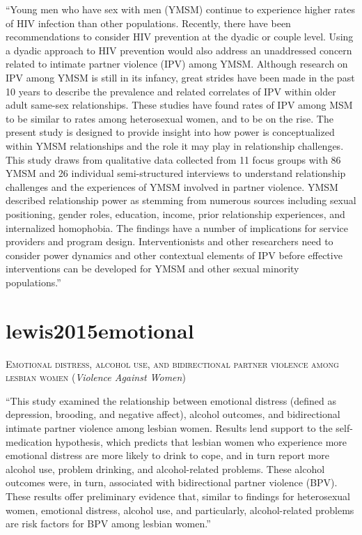 \documentclass[]{tufte-handout}
\begin{document}
``Young men who have sex with men (YMSM) continue to experience higher
rates of HIV infection than other populations. Recently, there have been
recommendations to consider HIV prevention at the dyadic or couple
level. Using a dyadic approach to HIV prevention would also address an
unaddressed concern related to intimate partner violence (IPV) among
YMSM. Although research on IPV among YMSM is still in its infancy, great
strides have been made in the past 10 years to describe the prevalence
and related correlates of IPV within older adult same-sex relationships.
These studies have found rates of IPV among MSM to be similar to rates
among heterosexual women, and to be on the rise. The present study is
designed to provide insight into how power is conceptualized within YMSM
relationships and the role it may play in relationship challenges. This
study draws from qualitative data collected from 11 focus groups with 86
YMSM and 26 individual semi-structured interviews to understand
relationship challenges and the experiences of YMSM involved in partner
violence. YMSM described relationship power as stemming from numerous
sources including sexual positioning, gender roles, education, income,
prior relationship experiences, and internalized homophobia. The
findings have a number of implications for service providers and program
design. Interventionists and other researchers need to consider power
dynamics and other contextual elements of IPV before effective
interventions can be developed for YMSM and other sexual minority
populations.''

\section{\texorpdfstring{\textcolor[HTML]{5b0057}{lewis2015emotional}}{}}\label{section-58}

\textsc{\large{Emotional distress, alcohol use, and bidirectional partner violence among lesbian women}}
(\emph{Violence Against Women})

``This study examined the relationship between emotional distress
(defined as depression, brooding, and negative affect), alcohol
outcomes, and bidirectional intimate partner violence among lesbian
women. Results lend support to the self-medication hypothesis, which
predicts that lesbian women who experience more emotional distress are
more likely to drink to cope, and in turn report more alcohol use,
problem drinking, and alcohol-related problems. These alcohol outcomes
were, in turn, associated with bidirectional partner violence (BPV).
These results offer preliminary evidence that, similar to findings for
heterosexual women, emotional distress, alcohol use, and particularly,
alcohol-related problems are risk factors for BPV among lesbian women.''
\end{document}
